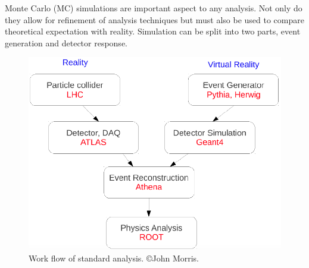Monte Carlo (MC) simulations are important aspect to any analysis. Not only do they allow for refinement of analysis techniques but must also be used to compare theoretical expectation with reality. Simulation can be split into two parts, event generation and detector response. 

\begin{figure}[!H]
\centering
\includegraphics[scale=0.5]{figures/MC-diagram.png}
\caption{Work flow of standard analysis. \copyright John Morris.}
\label{fig:decays}
\end{figure}

